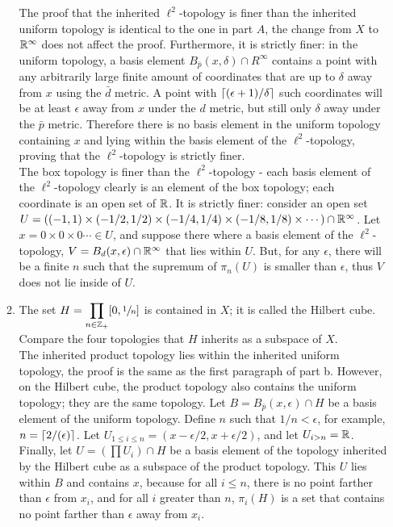 \documentclass[12pt,letterpaper]{article}
\begin{document}
\begin{enumerate}
\begin{enumerate}
    The proof that the inherited $\ell^2$-topology is finer than the inherited uniform topology is identical to the one in part $A$, the change from $X$ to $\mathbb{R}^\infty$ does not affect the proof. Furthermore, it is strictly finer: in the uniform topology, a basis element $B_{\bar{p}}(x,\delta) \cap R^\infty$ contains a point with any arbitrarily large finite amount of coordinates that are up to $\delta$ away from $x$ using the $\bar{d}$ metric. A point with $\lceil(\epsilon+1)/\delta\rceil$ such coordinates will be at least $\epsilon$ away from $x$ under the $d$ metric, but still only $\delta$ away under the $\bar{p}$ metric. Therefore there is no basis element in the uniform topology containing $x$ and lying within the basis element of the $\ell^2$-topology, proving that the $\ell^2$-topology is strictly finer.\\
    The box topology is finer than the $\ell^2$-topology - each basis element of the $\ell^2$-topology clearly is an element of the box topology; each coordinate is an open set of $\mathbb{R}$. It is strictly finer: consider an open set $U=((-1,1)\times(-1/2,1/2)\times(-1/4,1/4)\times(-1/8,1/8)\times\cdots)\cap \mathbb{R}^\infty$. Let $x=0\times0\times0\cdots \in U$, and suppose there where a basis element of the $\ell^2$-topology, $V=B_d(x,\epsilon)\cap \mathbb{R}^\infty$ that lies within $U$. But, for any $\epsilon$, there will be a finite $n$ such that the supremum of $\pi_n(U)$ is smaller than $\epsilon$, thus $V$ does not lie inside of $U$.
    \item The set $H=\displaystyle\prod_{n\in\mathbb{Z}_+} [0,\sfrac{1}{n}]$ is contained in $X$; it is called the Hilbert cube. Compare the four topologies that $H$ inherits as a subspace of $X$. \\
    The inherited product topology lies within the inherited uniform topology, the proof is the same as the first paragraph of part b. However, on the Hilbert cube, the product topology also contains the uniform topology; they are the same topology. Let $B=B_{\bar{p}}(x,\epsilon)\cap H$ be a basis element of the uniform topology. Define $n$ such that $1/n<\epsilon$, for example, $n=\lceil2/(\epsilon)\rceil$. Let $U_{1\leq i \leq n} = (x-\epsilon/2, x+\epsilon/2)$, and let $U_{i>n} = \mathbb{R}$. Finally, let $U=(\prod U_i) \cap H$ be a basis element of the topology inherited by the Hilbert cube as a subspace of the product topology. This $U$ lies within $B$ and contains $x$, because for all $i\leq n$, there is no point farther than $\epsilon$ from $x_i$, and for all $i$ greater than $n$, $\pi_i(H)$ is a set that contains no point farther than $\epsilon$ away from $x_i$. \\

\end{enumerate}
\end{enumerate}
\end{document}
